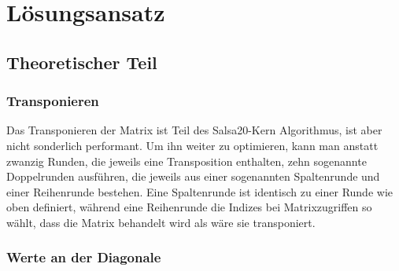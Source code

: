 \documentclass[course=erap]{aspdoc}
\begin{document}
\section{Lösungsansatz}
\subsection{Theoretischer Teil}
\subsubsection{Transponieren}

Das Transponieren der Matrix ist Teil des Salsa20-Kern Algorithmus, ist aber nicht sonderlich performant. 
Um ihn weiter zu optimieren, kann man anstatt zwanzig Runden, die jeweils eine Transposition enthalten, zehn sogenannte Doppelrunden 
ausführen, die jeweils aus einer sogenannten Spaltenrunde und einer Reihenrunde bestehen. Eine Spaltenrunde ist identisch zu einer 
Runde wie oben definiert, während eine Reihenrunde die Indizes bei Matrixzugriffen so wählt, dass die Matrix behandelt wird
als wäre sie transponiert.  

\subsubsection{Werte an der Diagonale}
\end{document}
